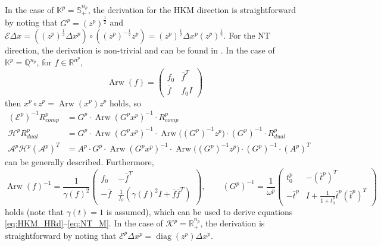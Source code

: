 In the case of $\mathbb{K}^p=\mathbb{S}_+^{n_p}$, the derivation for the HKM direction is straightforward by noting that $G^p=(z^p)^\frac{1}{2}$ and $\mathcal{E}\Delta x = ((z^p)^\frac{1}{2}\Delta x^p)\circ ((z^p)^{-\frac{1}{2}}z^p)=(z^p)^\frac{1}{2} \Delta x^p (z^p)^\frac{1}{2}$.
For the NT direction, the derivation is non-trivial and can be found in \cite{todd1998}.
In the case of $\mathbb{K}^p=\mathbb{Q}^{n_p}$, for $f\in \mathbb{R}^{n^p}$, %
\begin{equation}
    \operatorname{Arw}(f) = 
    \left(
    \begin{array}{cc}
        f_0 & \bar{f}^T \\
        \bar{f} & f_0 I
    \end{array}
    \right)
\end{equation}
then $x^p \circ z^p = \operatorname{Arw}(x^p)z^p$ holds, so
\begin{align*}
    (\mathcal{E}^p)^{-1}R^p_{comp} &= G^p \cdot \operatorname{Arw}(G^p x^p)^{-1} \cdot R^p_{comp}\\
    \mathcal{H}^p R^p_{dual} &= G^p \cdot \operatorname{Arw}(G^p x^p)^{-1} \cdot \operatorname{Arw}\big((G^p)^{-1} z^p\big) \cdot(G^p)^{-1} \cdot R^p_{dual}\\
    \mathcal{A}^p\mathcal{H}^p(\mathcal{A}^p)^T &= A^p \cdot G^p \cdot \operatorname{Arw}(G^p x^p)^{-1} \cdot \operatorname{Arw}\big((G^p)^{-1} z^p\big) \cdot(G^p)^{-1} \cdot (A^p)^T
\end{align*}
can be generally described. Furthermore,
\begin{equation*}
    \operatorname{Arw}(f)^{-1} = \frac{1}{\gamma(f)^2} \left(\begin{array}{cc}
        f_0 & -\bar{f}^T \\
        -\bar{f} & \frac{1}{f_0}(\gamma(f)^2 I + \bar{f}\bar{f}^T)
    \end{array}\right),
    \qquad
    (G^p)^{-1} = \frac{1}{\omega^p} \begin{pmatrix}
        t^p_0 & -(\bar{t}^p)^T \\
        -\bar{t}^p & I+\frac{1}{1 + t^p_0} \bar{t}^p(\bar{t}^p)^T
    \end{pmatrix}
\end{equation*}
holds (note that $\gamma(t)=1$ is assumed), which can be used to derive equations \eqref{eq:HKM_HRd}--\eqref{eq:NT_M}.
In the case of $\mathcal{K}^p=\mathbb{R}^{n_p}_+$, the derivation is straightforward by noting that $\mathcal{E}^p \Delta x^p = \operatorname{diag}(z^p) \Delta x^p$.